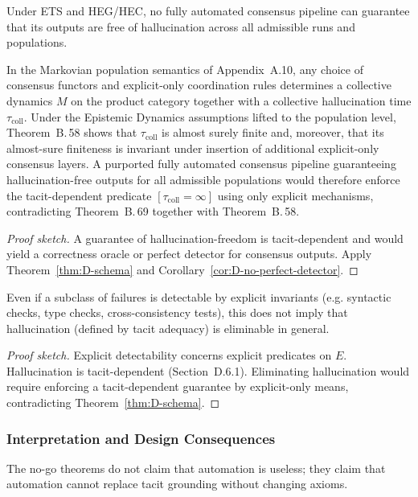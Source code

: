 \begin{corollary}\label{cor:D-no-auto-consensus}
Under ETS and HEG/HEC, no fully automated consensus pipeline can guarantee that its outputs are free of hallucination across all admissible runs and populations.
\end{corollary}
In the Markovian population semantics of Appendix~A.10, any choice of
consensus functors and explicit-only coordination rules determines a
collective dynamics $M$ on the product category together with a
collective hallucination time $\tau_{\mathrm{coll}}$. Under the Epistemic Dynamics
assumptions lifted to the population level, Theorem~B.\,58 shows that
$\tau_{\mathrm{coll}}$ is almost surely finite and, moreover, that its
almost-sure finiteness is invariant under insertion of additional
explicit-only consensus layers. A purported fully automated consensus
pipeline guaranteeing hallucination-free outputs for all admissible
populations would therefore enforce the tacit-dependent predicate
$[\tau_{\mathrm{coll}} = \infty]$ using only explicit mechanisms,
contradicting Theorem~B.\,69 together with Theorem~B.\,58.

\begin{proof}[Proof sketch]
A guarantee of hallucination-freedom is tacit-dependent and would yield a correctness oracle or perfect detector for consensus outputs. Apply Theorem~\ref{thm:D-schema} and Corollary~\ref{cor:D-no-perfect-detector}.
\end{proof}

\begin{corollary}\label{cor:D-detect-vs-elim}
Even if a subclass of failures is detectable by explicit invariants (e.g. syntactic checks, type checks, cross-consistency tests), this does not imply that hallucination (defined by tacit adequacy) is eliminable in general.
\end{corollary}

\begin{proof}[Proof sketch]
Explicit detectability concerns explicit predicates on $E$. Hallucination is tacit-dependent (Section~D.6.1). Eliminating hallucination would require enforcing a tacit-dependent guarantee by explicit-only means, contradicting Theorem~\ref{thm:D-schema}.
\end{proof}

\subsubsection{Interpretation and Design Consequences}
The no-go theorems do not claim that automation is useless; they claim that automation cannot replace tacit grounding without changing axioms.

